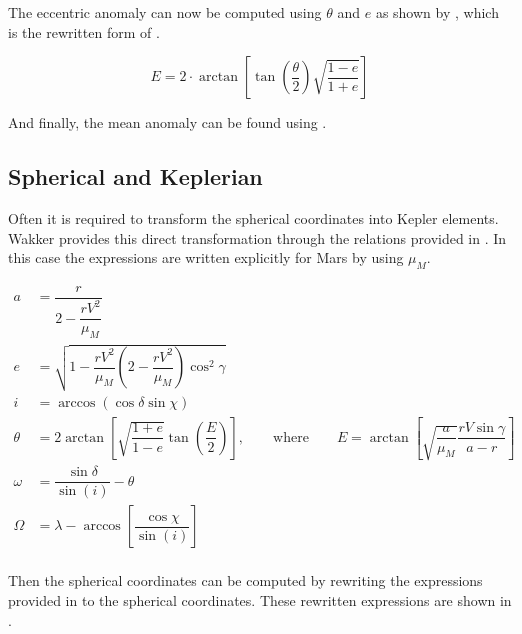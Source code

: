 The eccentric anomaly can now be computed using $\theta$ and $e$ as shown by , which is the rewritten form of .

\begin{equation}\label{eq:ecc}
E=2\cdot\arctan\left[\tan\left(\dfrac{\theta}{2}\right)\sqrt{\dfrac{1-e}{1+e}}\right]
\end{equation}

And finally, the mean anomaly can be found using \cite{noomen2013basic}.



\subsection{Spherical and Keplerian}
\label{subsec:spherkepl}
Often it is required to transform the spherical coordinates into Kepler elements. Wakker \cite{wakker2010astro1} provides this direct transformation through the relations provided in . In this case the expressions are written explicitly for Mars by using $\mu_{M}$.


\begin{equation} \label{eq:sphertokepl}
\begin{split}
a&=\dfrac{r}{2-\dfrac{rV^{2}}{\mu_{M}}}\\
e&=\sqrt{1-\dfrac{rV^{2}}{\mu_{M}}\left(2-\dfrac{rV^{2}}{\mu_{M}}\right)\cos^{2}\gamma }\\
i&=\arccos\left(\cos\delta \sin\chi \right)\\
\theta&=2\arctan\left[\sqrt{\dfrac{1+e}{1-e}}\tan\left(\dfrac{E}{2}\right)\right], \qquad \text{where} \qquad E=\arctan\left[\sqrt{\dfrac{a}{\mu_{M}}}\dfrac{rV\sin\gamma }{a-r}\right] \\
\omega&=\dfrac{\sin\delta }{\sin\left(i\right)}-\theta\\
\Omega&=\lambda-\arccos\left[\dfrac{\cos\chi }{\sin\left(i\right)}\right]\\
\end{split}
\end{equation}   

Then the spherical coordinates can be computed by rewriting the expressions provided in  to the spherical coordinates. These rewritten expressions are shown in . 

